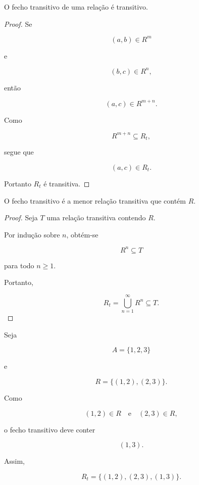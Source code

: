 \documentclass[../../main]{subfiles}
\begin{document}
\begin{prop}
	\label{prop:matematica:relacoes:fechos:fecho-transitivo-transitivo}

	O fecho transitivo de uma relação é transitivo.

\end{prop}

\begin{proof}

	Se

	\[
		(a,b)\in R^m
	\]

	e

	\[
		(b,c)\in R^n,
	\]

	então

	\[
		(a,c)\in R^{m+n}.
	\]

	Como

	\[
		R^{m+n}
		\subseteq
		R_t,
	\]

	segue que

	\[
		(a,c)\in R_t.
	\]

	Portanto \(R_t\) é transitiva.

\end{proof}

\begin{prop}
	\label{prop:matematica:relacoes:fechos:minimalidade-fecho-transitivo}

	O fecho transitivo é a menor relação transitiva que contém \(R\).

\end{prop}

\begin{proof}

	Seja \(T\) uma relação transitiva contendo \(R\).

	Por indução sobre \(n\), obtém-se

	\[
		R^n \subseteq T
	\]

	para todo \(n\ge 1\).

	Portanto,

	\[
		R_t
		=
		\bigcup_{n=1}^{\infty}R^n
		\subseteq T.
	\]

\end{proof}

\begin{ex}

	Seja

	\[
		A=\{1,2,3\}
	\]

	e

	\[
		R
		=
		\{
		(1,2),
		(2,3)
		\}.
	\]

	Como

	\[
		(1,2)\in R
		\quad\text{e}\quad
		(2,3)\in R,
	\]

	o fecho transitivo deve conter

	\[
		(1,3).
	\]

	Assim,

	\[
		R_t
		=
		\{
		(1,2),
		(2,3),
		(1,3)
		\}.
	\]

\end{ex}
\end{document}

